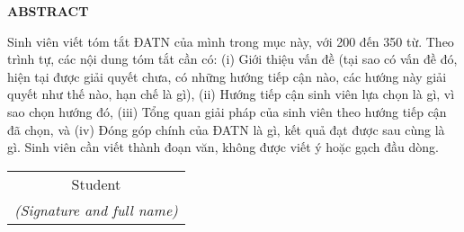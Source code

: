 \documentclass[../DoAn.tex]{subfiles}
\begin{document}
\begin{center}
    \Large{\textbf{ABSTRACT}}\\
\end{center}
\vspace{1cm}
Sinh viên viết tóm tắt ĐATN của mình trong mục này, với 200 đến 350 từ. Theo trình tự, các nội dung tóm tắt cần có: (i) Giới thiệu vấn đề (tại sao có vấn đề đó, hiện tại được giải quyết chưa, có những hướng tiếp cận nào, các hướng này giải quyết như thế nào, hạn chế là gì), (ii) Hướng tiếp cận sinh viên lựa chọn là gì, vì sao chọn hướng đó, (iii) Tổng quan giải pháp của sinh viên theo hướng tiếp cận đã chọn, và (iv) Đóng góp chính của ĐATN là gì, kết quả đạt được sau cùng là gì. Sinh viên cần viết thành đoạn văn, không được viết ý hoặc gạch đầu dòng.
\begin{flushright}
\begin{tabular}{@{}c@{}}
Student\\
\textit{(Signature and full name)}
\end{tabular}
\end{flushright}
\end{document}
